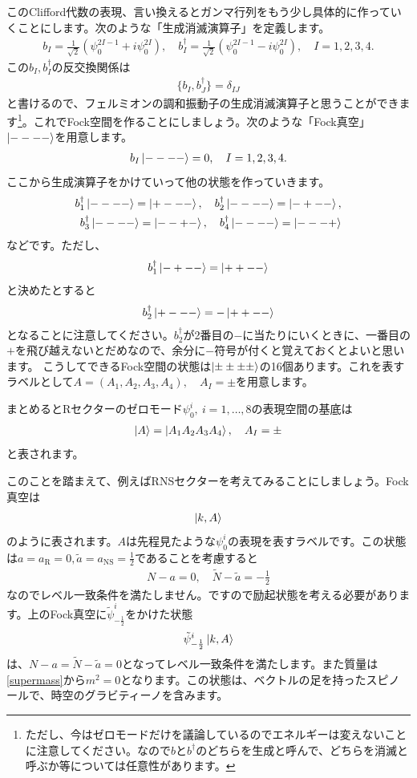 \documentclass[report,paper=a4, fontsize=12pt, line_length=16cm, number_of_lines=33,dvipdfmx]{jlreq}
\numberwithin{equation}{chapter}
\numberwithin{equation}{section}
\newcommand{\Nt}{\widetilde{N}}
\newcommand{\at}{\tilde{a}}
\newcommand{\psit}{\tilde{\psi}}
\newcommand{\aNS}{a_{\mathrm{NS}}}
\newcommand{\aR}{a_{\mathrm{R}}}
\begin{document}
このClifford代数の表現、言い換えるとガンマ行列をもう少し具体的に作っていくことにします。次のような「生成消滅演算子」を定義します。
\begin{align}
  b_{I}=\frac{1}{\sqrt{2}}(\psi_{0}^{2I-1}+i\psi_{0}^{2I}),\quad
  b^{\dag}_{I}=\frac{1}{\sqrt{2}}(\psi_{0}^{2I-1}-i\psi_{0}^{2I})
  ,\quad I=1,2,3,4.
\end{align}
この$b_I,b^{\dag}_{I}$の反交換関係は
\begin{align}
  \{b_{I},b^{\dag}_{J}\}=\delta_{IJ}
\end{align}
と書けるので、フェルミオンの調和振動子の生成消滅演算子と思うことができます\footnote{ただし、今はゼロモードだけを議論しているのでエネルギーは変えないことに注意してください。なので$b$と$b^{\dag}$のどちらを生成と呼んで、どちらを消滅と呼ぶか等については任意性があります。}。これでFock空間を作ることにしましょう。次のような「Fock真空」$\ket{----}$を用意します。
\begin{align}
  b_{I}\ket{----}=0,\quad I=1,2,3,4.
\end{align}
ここから生成演算子をかけていって他の状態を作っていきます。
\begin{align}
  b^{\dag}_1\ket{----}=\ket{+---},\quad
  b^{\dag}_2\ket{----}=\ket{-+--},\nonumber\\
  b^{\dag}_3\ket{----}=\ket{--+-},\quad
  b^{\dag}_4\ket{----}=\ket{---+}
\end{align}
などです。ただし、
\begin{align}
  b^{\dag}_1\ket{-+--}=\ket{++--}
\end{align}
と決めたとすると
\begin{align}
  b^{\dag}_2\ket{+---}=-\ket{++--}
\end{align}
となることに注意してください。$b^{\dag}_{2}$が2番目の$-$に当たりにいくときに、一番目の$+$を飛び越えないとだめなので、余分に$-$符号が付くと覚えておくとよいと思います。
こうしてできるFock空間の状態は$\ket{\pm\pm\pm\pm}$の16個あります。これを表すラベルとして$A=(A_1,A_2,A_3,A_4),\quad A_{I}=\pm$を用意します。

まとめるとRセクターのゼロモード$\psi^{i}_{0},\ i=1,\dots,8$の表現空間の基底は
\begin{align}
  \ket{A}=\ket{A_1A_2A_3A_4},\quad A_I=\pm
\end{align}
と表されます。

このことを踏まえて、例えばRNSセクターを考えてみることにしましょう。Fock真空は
\begin{align}
  \ket{k,A}
\end{align}
のように表されます。$A$は先程見たような$\psi^{i}_{0}$の表現を表すラベルです。この状態は$a=\aR=0,\at=\aNS=\frac12$であることを考慮すると
\begin{align}
  N-a=0,\quad \Nt-\at=-\frac12
\end{align}
なのでレベル一致条件を満たしません。ですので励起状態を考える必要があります。上のFock真空に$\psit^{i}_{-\frac12}$をかけた状態
\begin{align}
  \psit^{i}_{-\frac12}\ket{k,A}
\end{align}
は、$N-a=\Nt-\at=0$となってレベル一致条件を満たします。また質量は\eqref{supermass}から$m^2=0$となります。この状態は、ベクトルの足を持ったスピノールで、時空のグラビティーノを含みます。
\end{document}
